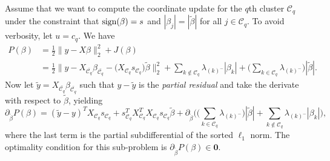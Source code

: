 Assume that we want to compute the coordinate update for the \(q\)th cluster
\(\mathcal{C}_q\) under the constraint that \(\operatorname{sign}(\beta) = s\) and
\(|\beta_j| = |\tilde \beta|\) for all \(j \in \mathcal{C}_q\).
To avoid verbosity, let
\(u = c_q\).
We have
\[
  \begin{aligned}
    P(\beta) & =  \frac{1}{2} \lVert y - X\beta\rVert_2^2 + J(\beta)                                                                                                                                                                                                                                   \\
             & = \frac{1}{2} \lVert y - X_{\bar{\mathcal{C}_q}} \beta_{\bar{\mathcal{C}_q}} - \big(X_{\mathcal{C}_q} s_{\mathcal{C}_q}\big)\tilde\beta  \rVert_2^2 + \sum_{k \notin {\mathcal{C}_q}} \lambda_{(k)^-}|\beta_k| + \bigg(\sum_{k \in {\mathcal{C}_q}} \lambda_{(k)^-}\bigg)|\tilde\beta|.
  \end{aligned}
\]
Now let \(\tilde y = X_{\bar{\mathcal{C}_q}} \beta_{\bar{\mathcal{C}_q}}\)
such that \(y - \tilde y\) is the \emph{partial residual} and take the
derivate with respect to \(\tilde\beta\), yielding
\[
  \partial_{\tilde\beta}
  P(\beta) = (\tilde y - y)^T X_{\mathcal{C}_q} s_{\mathcal{C}_q} + s_{\mathcal{C}_q}^T X_{{\mathcal{C}_q}}^T X_{\mathcal{C}_q} s_{\mathcal{C}_q} \tilde\beta + \partial_{\tilde\beta}\Bigg(\bigg(\sum_{k \in {\mathcal{C}_q}} \lambda_{(k)^-}\bigg)|\tilde\beta| + \sum_{k \notin \mathcal{C}_q}\lambda_{(k)^-}|\beta_k|\Bigg),
\]
where the last term is the partial subdifferential of the sorted \(\ell_1\)
norm. The optimality condition for this sub-problem is \( \partial_{\tilde
\beta} P(\beta) \in \boldsymbol{0}. \)

